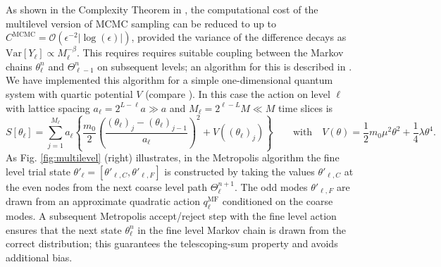 \documentclass[11pt]{article}
\begin{document}
As shown in the Complexity Theorem in \cite{Dodwell2015}, the computational cost of the multilevel version of MCMC sampling can be reduced to up to $C^{\text{MCMC}}=\mathcal{O}(\epsilon^{-2}|\log(\epsilon)|)$, provided the variance of the difference decays as $\text{Var}[Y_\ell]\propto M_\ell^{-\beta}$. This requires requires suitable coupling between the Markov chains $\theta_\ell^n$ and $\Theta_{\ell-1}^n$ on subsequent levels; an algorithm for this is described in \cite{Dodwell2015}. We have implemented this algorithm for a simple one-dimensional quantum system with quartic potential $V$ (compare \cite{Creutz1981}). In this case the action on level $\ell$ with lattice spacing $a_\ell=2^{L-\ell}a \gg a$ and $M_\ell=2^{\ell-L}M \ll M$ time slices is
\begin{equation}
  S\left[\theta_\ell\right] = \sum_{j=1}^{M_\ell} a_\ell\left\{\frac{m_0}{2}\left(\frac{(\theta_\ell)_j-(\theta_\ell)_{j-1}}{a_\ell}\right)^2 + V\left((\theta_\ell)_j\right)\right\}\qquad \text{with}\quad V(\theta) = \frac{1}{2}m_0\mu^2\theta^2+\frac{1}{4}\lambda\theta^4.\label{eqn:quantum_action}
\end{equation}
As Fig. \ref{fig:multilevel} (right) illustrates, in the Metropolis algorithm the fine level trial state $\theta'_\ell=[\theta'_{\ell,C},\theta'_{\ell,F}]$ is constructed by taking the values $\theta'_{\ell,C}$ at the even nodes from the next coarse level path $\Theta_\ell^{n+1}$. The odd modes $\theta'_{\ell,F}$ are drawn from an approximate quadratic action $q_{\ell}^{\text{MF}}$ conditioned on the coarse modes. A subsequent Metropolis accept/reject step with the fine level action ensures that the next state $\theta_\ell^n$ in the fine level Markov chain is drawn from the correct distribution; this guarantees the telescoping-sum property and avoids additional bias.
\end{document}
